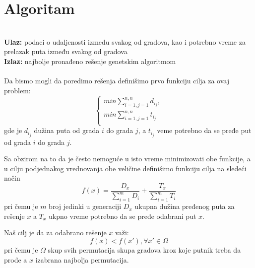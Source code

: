 \documentclass[a4paper]{article}
\begin{document}
\section{Algoritam}
\\
\textbf{Ulaz:} podaci o udaljenosti između svakog od gradova, kao i potrebno vreme za prelazak puta između svakog od gradova
\\
\textbf{Izlaz:} najbolje pronađeno rešenje genetskim algoritmom
\\
\\
Da bismo mogli da poredimo rešenja definišimo prvo funkciju cilja za ovaj problem:
\[ 
  \begin{cases}
    min \sum_{i=1,j=1}^{n,n} d_i_j ,  \\
    min \sum_{i=1,j=1}^{n,n} t_i_j\\
  \end{cases}
\]
gde je $d_i_j$ dužina puta od grada $i$ do grada $j$, a $t_i_j$ veme potrebno da se pređe put od grada $i$ do grada $j$.\par
Sa obzirom na to da je često nemoguće u isto vreme minimizovati obe funkcije, a u cilju podjednakog vrednovanja obe veličine definišimo funkciju cilja na sledeći način
$$ f(x)=\frac{D_x}{\sum_{i=1}^{m} D_i} + \frac{T_x}{\sum_{i=1}^{m} T_i}$$
pri čemu je $m$ broj jedinki u generaciji $D_x$ ukupna dužina pređenog puta za rešenje $x$ a $T_x$ ukpno vreme potrebno da se pređe odabrani put $x$.\par
Naš cilj je da za odabrano rešenje $x$ važi:
$$f(x)<f(x') , \forall x' \in \Omega $$
pri čemu je $\Omega$ skup svih permutacija skupa gradova kroz koje putnik treba da prođe a $x$ izabrana najbolja permutacija.\par
\newpage
\end{document}

